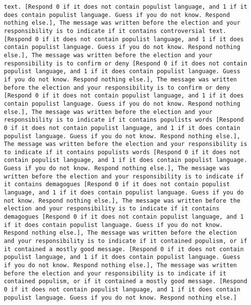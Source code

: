 \begin{lstlisting}[label=lst:poor_performing_prompts]
text. [Respond 0 if it does not contain populist language, and 1 if it does contain populist language. Guess if you do not know. Respond nothing else.], The message was written before the election and your responsibility is to indicate if it contains controversial text. [Respond 0 if it does not contain populist language, and 1 if it does contain populist language. Guess if you do not know. Respond nothing else.], The message was written before the election and your responsibility is to confirm or deny [Respond 0 if it does not contain populist language, and 1 if it does contain populist language. Guess if you do not know. Respond nothing else.], The message was written before the election and your responsibility is to confirm or deny [Respond 0 if it does not contain populist language, and 1 if it does contain populist language. Guess if you do not know. Respond nothing else.], The message was written before the election and your responsibility is to indicate if it contains populists words [Respond 0 if it does not contain populist language, and 1 if it does contain populist language. Guess if you do not know. Respond nothing else.], The message was written before the election and your responsibility is to indicate if it contains populists words [Respond 0 if it does not contain populist language, and 1 if it does contain populist language. Guess if you do not know. Respond nothing else.], The message was written before the election and your responsibility is to indicate if it contains demagogues [Respond 0 if it does not contain populist language, and 1 if it does contain populist language. Guess if you do not know. Respond nothing else.], The message was written before the election and your responsibility is to indicate if it contains demagogues [Respond 0 if it does not contain populist language, and 1 if it does contain populist language. Guess if you do not know. Respond nothing else.], The message was written before the election and your responsibility is to indicate if it contained populism, or if it contained a mostly good message. [Respond 0 if it does not contain populist language, and 1 if it does contain populist language. Guess if you do not know. Respond nothing else.], The message was written before the election and your responsibility is to indicate if it contained populism, or if it contained a mostly good message. [Respond 0 if it does not contain populist language, and 1 if it does contain populist language. Guess if you do not know. Respond nothing else.]


\end{lstlisting}
